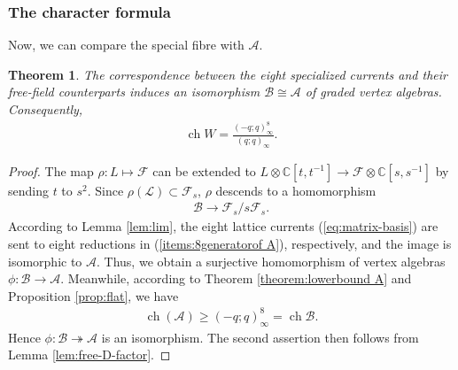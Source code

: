 \documentclass[11pt]{amsart}
\newtheorem{theorem}{Theorem}[section]
\theoremstyle{definition}
\theoremstyle{remark}
\DeclareMathOperator{\ch}{ch}
\begin{document}
\subsubsection{The character formula}
Now, we can compare the special fibre with $\mathcal{A}$.
\begin{theorem}\label{theorem:character of A}
The correspondence between the eight specialized currents and their
free-field counterparts induces an isomorphism
$\mathcal B\cong\mathcal A$ of graded vertex algebras. Consequently, 
\begin{align*}
	\ch W=\frac{(-q;q)_{\infty}^8}{(q;q)_{\infty}}.
\end{align*}	
\end{theorem}
\begin{proof}
The map $\rho: L\mapsto \mathcal{F}$ can be extended to $L\otimes \mathbb{C}[t,t^{-1}]\rightarrow \mathcal{F}\otimes \mathbb{C}[s,s^{-1}]$ by sending $t$ to $s^2$. Since $\rho(\mathscr L)\subset \mathcal{F}_s$, $\rho$ descends to a homomorphism
\begin{align*}
\mathcal{B}\longrightarrow \mathcal{F}_s/s\mathcal{F}_s.
\end{align*}
 According to Lemma \ref{lem:lim}, the eight lattice currents (\ref{eq:matrix-basis}) are sent to eight reductions in (\ref{items:8generatorof A}), respectively, and the image is isomorphic to $\mathcal{A}$. Thus, we obtain a surjective homomorphism of vertex algebras $\phi: \mathcal{B}\rightarrow \mathcal{A}$. Meanwhile, according to Theorem \ref{theorem:lowerbound A} and Proposition \ref{prop:flat}, we have 
 \begin{align*}
 \ch(\mathcal{A})\geq (-q;q)_\infty^8=\ch \mathcal{B}.	
 \end{align*}
Hence $\phi: \mathcal{B}\twoheadrightarrow \mathcal{A}$ is an isomorphism. The second assertion then follows from Lemma \ref{lem:free-D-factor}. 
\end{proof}
\end{document}
